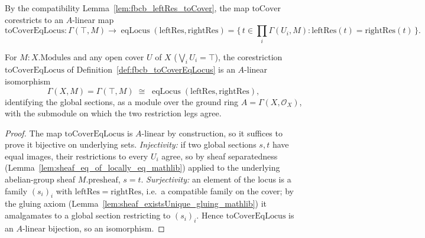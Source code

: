 \begin{definition}
  \label{def:fbcb_toCoverEqLocus}
  By the compatibility Lemma~\ref{lem:fbcb_leftRes_toCover}, the map \(\mathrm{toCover}\) corestricts to
  an \(A\)-linear map
  \[
    \mathrm{toCoverEqLocus} : \Gamma(\top, M)
      \longrightarrow \operatorname{eqLocus}(\mathrm{leftRes}, \mathrm{rightRes})
      = \{\, t \in \textstyle\prod_i \Gamma(U_i,M) : \mathrm{leftRes}(t) = \mathrm{rightRes}(t)\,\}.
  \]
\end{definition}

\begin{lemma}
  \label{lem:fbcb_gammaTopEquivEqLocus}
  For \(M : X.\mathrm{Modules}\) and any open cover \(U\) of \(X\) (\(\bigvee_i U_i = \top\)), the
  corestriction \(\mathrm{toCoverEqLocus}\) of Definition~\ref{def:fbcb_toCoverEqLocus} is an
  \(A\)-linear isomorphism
  \[
    \Gamma(X, M) = \Gamma(\top, M) \;\cong\; \operatorname{eqLocus}(\mathrm{leftRes}, \mathrm{rightRes}),
  \]
  identifying the global sections, as a module over the ground ring \(A = \Gamma(X,\mathcal{O}_X)\), with
  the submodule on which the two restriction legs agree.
  \begin{proof}
    The map \(\mathrm{toCoverEqLocus}\) is \(A\)-linear by construction, so it suffices to prove it
    bijective on underlying sets. \emph{Injectivity:} if two global sections \(s, t\) have equal images,
    their restrictions to every \(U_i\) agree, so by sheaf separatedness
    (Lemma~\ref{lem:sheaf_eq_of_locally_eq_mathlib}) applied to the underlying abelian-group sheaf
    \(M.\mathrm{presheaf}\), \(s = t\). \emph{Surjectivity:} an element of the locus is a family
    \((s_i)_i\) with \(\mathrm{leftRes} = \mathrm{rightRes}\), i.e.\ a compatible family on the cover; by
    the gluing axiom (Lemma~\ref{lem:sheaf_existsUnique_gluing_mathlib}) it amalgamates to a global
    section restricting to \((s_i)_i\). Hence \(\mathrm{toCoverEqLocus}\) is an \(A\)-linear bijection,
    so an isomorphism.
  \end{proof}
\end{lemma}

